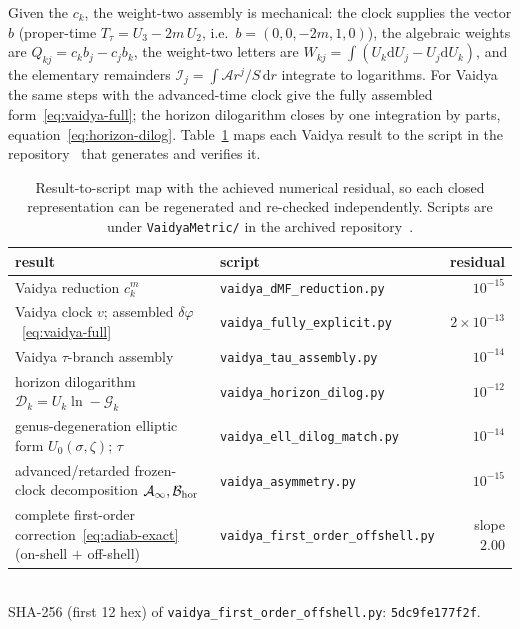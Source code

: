 \documentclass[12pt]{iopart}
\newcommand{\dd}{\mathrm{d}}
\theoremstyle{plain}
\theoremstyle{definition}
\theoremstyle{plain}
\theoremstyle{remark}
\begin{document}
Given the $c_k$, the weight-two assembly is mechanical: the clock supplies the vector
$b$ (proper-time $T_\tau=U_3-2m\,U_2$, i.e.\ $b=(0,0,-2m,1,0)$), the algebraic
weights are $Q_{kj}=c_kb_j-c_jb_k$, the weight-two
letters are $W_{kj}=\int(U_k\dd U_j-U_j\dd U_k)$, and the elementary remainders
$\mathcal{I}_j=\int\mathcal{A}r^j/S\,\dd r$ integrate to logarithms. For Vaidya the
same steps with the advanced-time clock give the fully assembled
form~\eqref{eq:vaidya-full}; the horizon dilogarithm closes by one integration by
parts, equation~\eqref{eq:horizon-dilog}. Table~\ref{tab:script-map} maps each Vaidya result to
the script in the repository~\cite{Rosignoli2026CodeJMP} that generates and verifies it.
\begin{table}[htbp]
    \centering
    \caption{Result-to-script map with the achieved numerical residual, so each closed
    representation can be regenerated and re-checked independently. Scripts are under
    \texttt{VaidyaMetric/} in the archived repository~\cite{Rosignoli2026CodeJMP}.}
    \label{tab:script-map}
    \small
    \begin{tabular}{@{}p{}>{\raggedright\arraybackslash}p{}r@{}}
        \hline\hline
        result & script & residual\\
        \hline
        Vaidya reduction $c_k^m$
            & \texttt{vaidya\_dMF\_reduction.py} & $10^{-15}$\\
        Vaidya clock $v$; assembled $\delta\varphi$~\eqref{eq:vaidya-full}
            & \texttt{vaidya\_fully\_explicit.py} & $2\times10^{-13}$\\
        Vaidya $\tau$-branch assembly
            & \texttt{vaidya\_tau\_assembly.py} & $10^{-14}$\\
        horizon dilogarithm $\mathcal{D}_k=U_k\ln-\mathcal{G}_k$
            & \texttt{vaidya\_horizon\_dilog.py} & $10^{-12}$\\
        genus-degeneration elliptic form $U_0(\sigma,\zeta)$; $\tau$
            & \texttt{vaidya\_ell\_dilog\_match.py} & $10^{-14}$\\
        advanced/retarded frozen-clock decomposition $\mathcal{A}_\infty,\mathcal{B}_{\rm hor}$
            & \texttt{vaidya\_asymmetry.py} & $10^{-15}$\\
        complete first-order correction~\eqref{eq:adiab-exact} (on-shell $+$ off-shell)
            & \texttt{vaidya\_first\_\allowbreak order\_\allowbreak offshell.py} & slope $2.00$\\
        \hline\hline
    \end{tabular}
    \\[2pt]
    {\footnotesize SHA-256 (first 12 hex) of
    \texttt{vaidya\_first\_order\_offshell.py}: \texttt{5dc9fe177f2f}.}
\end{table}
\end{document}
